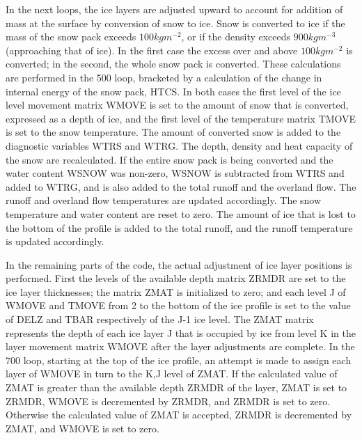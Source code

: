 In the next loops, the ice layers are adjusted upward to account for addition of mass at the surface by conversion of snow to ice. Snow is converted to ice if the mass of the snow pack exceeds $100 kg m^{-2}$, or if the density exceeds $900 kg m^{-3}$ (approaching that of ice). In the first case the excess over and above $100 kg m^{-2}$ is converted; in the second, the whole snow pack is converted. These calculations are performed in the 500 loop, bracketed by a calculation of the change in internal energy of the snow pack, H\+T\+C\+S. In both cases the first level of the ice level movement matrix W\+M\+O\+V\+E is set to the amount of snow that is converted, expressed as a depth of ice, and the first level of the temperature matrix T\+M\+O\+V\+E is set to the snow temperature. The amount of converted snow is added to the diagnostic variables W\+T\+R\+S and W\+T\+R\+G. The depth, density and heat capacity of the snow are recalculated. If the entire snow pack is being converted and the water content W\+S\+N\+O\+W was non-\/zero, W\+S\+N\+O\+W is subtracted from W\+T\+R\+S and added to W\+T\+R\+G, and is also added to the total runoff and the overland flow. The runoff and overland flow temperatures are updated accordingly. The snow temperature and water content are reset to zero. The amount of ice that is lost to the bottom of the profile is added to the total runoff, and the runoff temperature is updated accordingly.

In the remaining parts of the code, the actual adjustment of ice layer positions is performed. First the levels of the available depth matrix Z\+R\+M\+D\+R are set to the ice layer thicknesses; the matrix Z\+M\+A\+T is initialized to zero; and each level J of W\+M\+O\+V\+E and T\+M\+O\+V\+E from 2 to the bottom of the ice profile is set to the value of D\+E\+L\+Z and T\+B\+A\+R respectively of the J-\/1 ice level. The Z\+M\+A\+T matrix represents the depth of each ice layer J that is occupied by ice from level K in the layer movement matrix W\+M\+O\+V\+E after the layer adjustments are complete. In the 700 loop, starting at the top of the ice profile, an attempt is made to assign each layer of W\+M\+O\+V\+E in turn to the K,J level of Z\+M\+A\+T. If the calculated value of Z\+M\+A\+T is greater than the available depth Z\+R\+M\+D\+R of the layer, Z\+M\+A\+T is set to Z\+R\+M\+D\+R, W\+M\+O\+V\+E is decremented by Z\+R\+M\+D\+R, and Z\+R\+M\+D\+R is set to zero. Otherwise the calculated value of Z\+M\+A\+T is accepted, Z\+R\+M\+D\+R is decremented by Z\+M\+A\+T, and W\+M\+O\+V\+E is set to zero.

